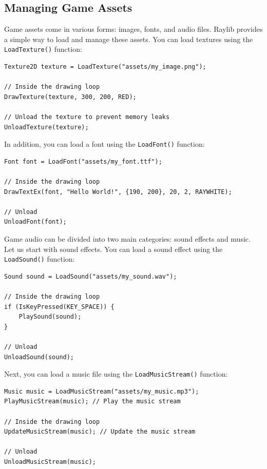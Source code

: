 \subsection{Managing Game Assets}

Game assets come in various forms: images, fonts, and audio files. Raylib provides a simple way to load and manage these assets. You can load textures using the \texttt{LoadTexture()} function:
\begin{verbatim}
Texture2D texture = LoadTexture("assets/my_image.png");

// Inside the drawing loop
DrawTexture(texture, 300, 200, RED);

// Unload the texture to prevent memory leaks
UnloadTexture(texture);
\end{verbatim}

In addition, you can load a font using the \texttt{LoadFont()} function:
\begin{verbatim}
Font font = LoadFont("assets/my_font.ttf");

// Inside the drawing loop
DrawTextEx(font, "Hello World!", {190, 200}, 20, 2, RAYWHITE);

// Unload
UnloadFont(font);
\end{verbatim}


Game audio can be divided into two main categories: sound effects and music. Let us start with sound effects. You can load a sound effect using the \texttt{LoadSound()} function:
\begin{verbatim}
Sound sound = LoadSound("assets/my_sound.wav");

// Inside the drawing loop
if (IsKeyPressed(KEY_SPACE)) {
    PlaySound(sound);
}

// Unload
UnloadSound(sound);
\end{verbatim}

Next, you can load a music file using the \texttt{LoadMusicStream()} function:
\begin{verbatim}
Music music = LoadMusicStream("assets/my_music.mp3");
PlayMusicStream(music); // Play the music stream

// Inside the drawing loop
UpdateMusicStream(music); // Update the music stream

// Unload
UnloadMusicStream(music);
\end{verbatim}


